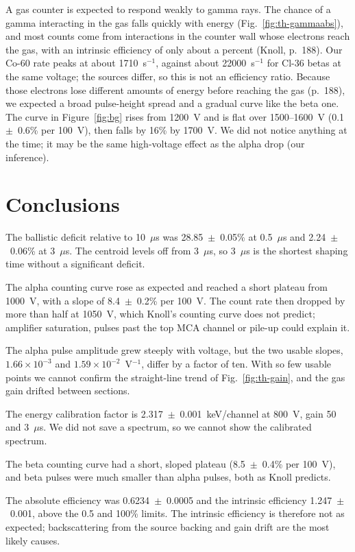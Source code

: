 \documentclass[12pt]{article}
\begin{document}
A gas counter is expected to respond weakly to gamma rays. The chance of a gamma interacting in the gas falls quickly with energy (Fig.~\ref{fig:th-gammaabs}), and most counts come from interactions in the counter wall whose electrons reach the gas, with an intrinsic efficiency of only about a percent (Knoll, p.~188). Our Co-60 rate peaks at about 1710~s$^{-1}$, against about 22000~s$^{-1}$ for Cl-36 betas at the same voltage; the sources differ, so this is not an efficiency ratio. Because those electrons lose different amounts of energy before reaching the gas (p.~188), we expected a broad pulse-height spread and a gradual curve like the beta one. The curve in Figure~\ref{fig:bg} rises from 1200~V and is flat over 1500--1600~V (0.1~$\pm$~0.6\% per 100~V), then falls by 16\% by 1700~V. We did not notice anything at the time; it may be the same high-voltage effect as the alpha drop (our inference).


\section{Conclusions}
\label{sec:conclusions}

The ballistic deficit relative to 10~$\mu$s was 28.85~$\pm$~0.05\% at 0.5~$\mu$s and 2.24~$\pm$~0.06\% at 3~$\mu$s. The centroid levels off from 3~$\mu$s, so 3~$\mu$s is the shortest shaping time without a significant deficit.

The alpha counting curve rose as expected and reached a short plateau from 1000~V, with a slope of 8.4~$\pm$~0.2\% per 100~V. The count rate then dropped by more than half at 1050~V, which Knoll's counting curve does not predict; amplifier saturation, pulses past the top MCA channel or pile-up could explain it.

The alpha pulse amplitude grew steeply with voltage, but the two usable slopes, $1.66\times10^{-3}$ and $1.59\times10^{-2}$~V$^{-1}$, differ by a factor of ten. With so few usable points we cannot confirm the straight-line trend of Fig.~\ref{fig:th-gain}, and the gas gain drifted between sections.

The energy calibration factor is 2.317~$\pm$~0.001~keV/channel at 800~V, gain 50 and 3~$\mu$s. We did not save a spectrum, so we cannot show the calibrated spectrum.

The beta counting curve had a short, sloped plateau (8.5~$\pm$~0.4\% per 100~V), and beta pulses were much smaller than alpha pulses, both as Knoll predicts.

The absolute efficiency was 0.6234~$\pm$~0.0005 and the intrinsic efficiency 1.247~$\pm$~0.001, above the 0.5 and 100\% limits. The intrinsic efficiency is therefore not as expected; backscattering from the source backing and gain drift are the most likely causes.
\end{document}
